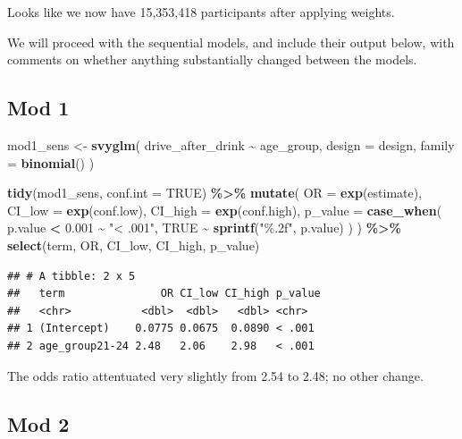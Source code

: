 \documentclass[
]{article}
\newenvironment{Shaded}{\begin{snugshade}}{\end{snugshade}}
\newcommand{\AttributeTok}[1]{\textcolor[rgb]{0.13,0.29,0.53}{#1}}
\newcommand{\ConstantTok}[1]{\textcolor[rgb]{0.56,0.35,0.01}{#1}}
\newcommand{\FloatTok}[1]{\textcolor[rgb]{0.00,0.00,0.81}{#1}}
\newcommand{\FunctionTok}[1]{\textcolor[rgb]{0.13,0.29,0.53}{\textbf{#1}}}
\newcommand{\NormalTok}[1]{#1}
\newcommand{\OtherTok}[1]{\textcolor[rgb]{0.56,0.35,0.01}{#1}}
\newcommand{\SpecialCharTok}[1]{\textcolor[rgb]{0.81,0.36,0.00}{\textbf{#1}}}
\newcommand{\StringTok}[1]{\textcolor[rgb]{0.31,0.60,0.02}{#1}}
\begin{document}
Looks like we now have 15,353,418 participants after applying weights.

We will proceed with the sequential models, and include their output
below, with comments on whether anything substantially changed between
the models.

\subsection{Mod 1}\label{mod-1}

\begin{Shaded}
\begin{Highlighting}[]
\NormalTok{mod1\_sens }\OtherTok{\textless{}{-}} \FunctionTok{svyglm}\NormalTok{(}
\NormalTok{  drive\_after\_drink }\SpecialCharTok{\textasciitilde{}}\NormalTok{ age\_group,}
  \AttributeTok{design =}\NormalTok{ design,}
  \AttributeTok{family =} \FunctionTok{binomial}\NormalTok{()}
\NormalTok{) }


\FunctionTok{tidy}\NormalTok{(mod1\_sens, }\AttributeTok{conf.int =} \ConstantTok{TRUE}\NormalTok{) }\SpecialCharTok{\%\textgreater{}\%}
 \FunctionTok{mutate}\NormalTok{(}
    \AttributeTok{OR =} \FunctionTok{exp}\NormalTok{(estimate),}
    \AttributeTok{CI\_low =} \FunctionTok{exp}\NormalTok{(conf.low),}
    \AttributeTok{CI\_high =} \FunctionTok{exp}\NormalTok{(conf.high),}
     \AttributeTok{p\_value =} \FunctionTok{case\_when}\NormalTok{(}
\NormalTok{      p.value }\SpecialCharTok{\textless{}} \FloatTok{0.001} \SpecialCharTok{\textasciitilde{}} \StringTok{"\textless{} .001"}\NormalTok{,}
      \ConstantTok{TRUE} \SpecialCharTok{\textasciitilde{}} \FunctionTok{sprintf}\NormalTok{(}\StringTok{"\%.2f"}\NormalTok{, p.value)}
\NormalTok{    )}
\NormalTok{  ) }\SpecialCharTok{\%\textgreater{}\%}
  \FunctionTok{select}\NormalTok{(term, OR, CI\_low, CI\_high, p\_value)}
\end{Highlighting}
\end{Shaded}

\begin{verbatim}
## # A tibble: 2 x 5
##   term               OR CI_low CI_high p_value
##   <chr>           <dbl>  <dbl>   <dbl> <chr>  
## 1 (Intercept)    0.0775 0.0675  0.0890 < .001 
## 2 age_group21-24 2.48   2.06    2.98   < .001
\end{verbatim}

The odds ratio attentuated very slightly from 2.54 to 2.48; no other
change.

\subsection{Mod 2}\label{mod-2}
\end{document}
